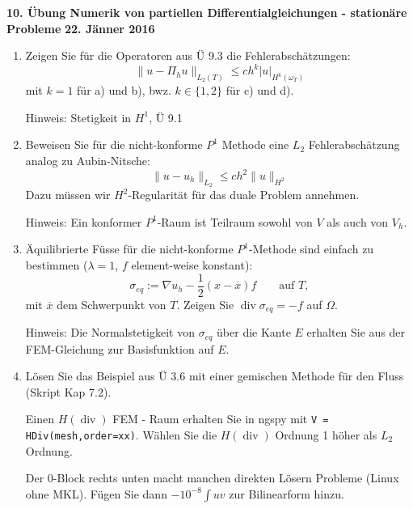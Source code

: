 \documentclass[11pt,a4paper]{report}
\begin{document}
\begin{center}
\textbf{10. \"Ubung Numerik von partiellen Differentialgleichungen - station\"are Probleme} \newline 
\textbf{22. J\"anner 2016}
\end{center}

\begin{enumerate}



\item Zeigen Sie f\"ur die Operatoren aus \"U 9.3 die
  Fehlerabsch\"atzungen:
$$
\| u - \Pi_h u \|_{L_2(T)} \leq c h^k | u |_{H^k(\omega_T)}
$$
mit $k = 1$ f\"ur a) und b), bwz. $k \in \{1,2\}$ f\"ur c) und d).

Hinweis: Stetigkeit in $H^1$, \"U 9.1

\item Beweisen Sie f\"ur die nicht-konforme $P^1$ Methode eine $L_2$
  Fehlerabsch\"atzung analog zu Aubin-Nitsche:
$$
\| u - u_h \|_{L_2} \leq c h^2 \| u \|_{H^2}
$$
Dazu m\"ussen wir $H^2$-Regularit\"at f\"ur das duale Problem annehmen. 

Hinweis: Ein konformer $P^1$-Raum ist Teilraum sowohl von $V$ als auch
von $V_h$.

\item \"Aquilibrierte F\"usse f\"ur die nicht-konforme $P^1$-Methode
  sind einfach zu bestimmen ($\lambda = 1$, $f$ element-weise konstant):
$$
\sigma_{eq} := \nabla u_h - \frac{1}{2}(x-\overline x) f \qquad \text{
auf } T,
$$
mit $\overline x$ dem Schwerpunkt von $T$. Zeigen Sie
$\operatorname{div} \sigma_{eq} = -f$ auf $\Omega$. 

Hinweis: Die Normalstetigkeit von $\sigma_{eq}$ \"uber die Kante $E$ erhalten Sie aus
der FEM-Gleichung zur Basisfunktion auf $E$.

\item L\"osen Sie das Beispiel aus \"U 3.6 mit einer gemischen Methode
  f\"ur den Fluss (Skript Kap 7.2). 

Einen $H(\operatorname{div})$ FEM - Raum erhalten Sie in ngspy mit {\tt V =
  HDiv(mesh,order=xx)}.  W\"ahlen Sie die $H(\operatorname{div})$ Ordnung 1 h\"oher
als $L_2$ Ordnung. 

Der 0-Block rechts unten macht manchen direkten L\"osern Probleme
(Linux ohne MKL). F\"ugen Sie dann $-10^{-8} \int u v$ zur
Bilinearform hinzu.
\end{enumerate}
\end{document}
